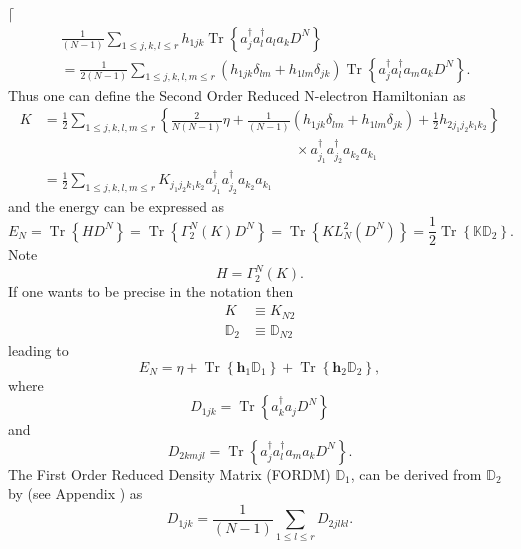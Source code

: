 \documentclass[aps,preprint]{revtex4}%
\begin{document}
$\lceil$%
\begin{align}
&  \frac{1}{\left(  N-1\right)  }\sum_{1\leq j,k,l\leq r}h_{1jk}%
\operatorname{Tr}\left\{  a_{j}^{\dagger}a_{l}^{\dagger}a_{l}a_{k}%
D^{N}\right\} \\
&  =\frac{1}{2\left(  N-1\right)  }\sum_{1\leq j,k,l,m\leq r}\left(
h_{1jk}\delta_{lm}+h_{1lm}\delta_{jk}\right)  \operatorname{Tr}\left\{
a_{j}^{\dagger}a_{l}^{\dagger}a_{m}a_{k}D^{N}\right\}  .
\end{align}
Thus one can define the Second Order Reduced N-electron Hamiltonian as
\begin{align}
K  &  =\frac{1}{2}\sum_{1\leq j,k,l,m\leq r}\left\{  \frac{2}{N\left(
N-1\right)  }\eta+\frac{1}{\left(  N-1\right)  }\left(  h_{1jk}\delta
_{lm}+h_{1lm}\delta_{jk}\right)  +\frac{1}{2}h_{2j_{1}j_{2}k_{1}k_{2}}\right\}
\nonumber\\
&  \qquad\qquad\qquad\qquad\qquad\qquad\qquad\qquad\qquad\times a_{j_{1}%
}^{\dagger}a_{j_{2}}^{\dagger}a_{k_{2}}a_{k_{1}}\nonumber\\
&  =\frac{1}{2}\sum_{1\leq j,k,l,m\leq r}K_{j_{1}j_{2}k_{1}k_{2}}a_{j_{1}%
}^{\dagger}a_{j_{2}}^{\dagger}a_{k_{2}}a_{k_{1}}%
\end{align}
and the energy can be expressed as
\begin{equation}
E_{N}=\operatorname{Tr}\left\{  HD^{N}\right\}  =\operatorname{Tr}\left\{
\Gamma_{2}^{N}\left(  K\right)  D^{N}\right\}  =\operatorname{Tr}\left\{
KL_{N}^{2}\left(  D^{N}\right)  \right\}  =\frac{1}{2}\operatorname{Tr}%
\left\{  \mathbb{KD}_{2}\right\}  .
\end{equation}
Note
\begin{equation}
H=\Gamma_{2}^{N}\left(  K\right)  .
\end{equation}
If one wants to be precise in the notation then
\begin{align}
K  &  \equiv K_{N2}\\
\mathbb{D}_{2}  &  \equiv\mathbb{D}_{N2}%
\end{align}
leading to
\begin{equation}
E_{N}=\eta+\operatorname{Tr}\left\{  \mathbf{h}_{1}\mathbb{D}_{1}\right\}
+\operatorname{Tr}\left\{  \mathbf{h}_{2}\mathbb{D}_{2}\right\}  ,
\label{red_en}%
\end{equation}
where
\begin{equation}
D_{1jk}=\operatorname{Tr}\left\{  a_{k}^{\dagger}a_{j}D^{N}\right\}
\end{equation}
and
\begin{equation}
D_{2kmjl}=\operatorname{Tr}\left\{  a_{j}^{\dagger}a_{l}^{\dagger}a_{m}%
a_{k}D^{N}\right\}  .
\end{equation}
The First Order Reduced Density Matrix (FORDM) $\mathbb{D}_{1}$, can be
derived from $\mathbb{D}_{2}$ by (see Appendix ) as
\begin{equation}
D_{1jk}=\frac{1}{\left(  N-1\right)  }\sum_{1\leq l\leq r}D_{2jlkl}.
\end{equation}
\end{document}
